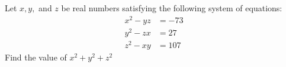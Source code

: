 Let $x, y,$ and $z$ be real numbers satisfying the following system of equations:\[
\begin{aligned} x^2 - yz &= -73 \\ y^2 - zx &= 27 \\ z^2 - xy &= 107 \end{aligned}
\]Find the value of $x^2 + y^2 + z^2$
